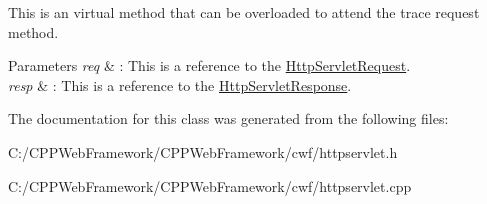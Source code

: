 This is an virtual method that can be overloaded to attend the trace request method. 


\begin{DoxyParams}{Parameters}
{\em req} & \+: This is a reference to the \mbox{\hyperlink{class_http_servlet_request}{Http\+Servlet\+Request}}. \\
\hline
{\em resp} & \+: This is a reference to the \mbox{\hyperlink{class_http_servlet_response}{Http\+Servlet\+Response}}. \\
\hline
\end{DoxyParams}


The documentation for this class was generated from the following files\+:\begin{DoxyCompactItemize}
\item 
C\+:/\+C\+P\+P\+Web\+Framework/\+C\+P\+P\+Web\+Framework/cwf/httpservlet.\+h\item 
C\+:/\+C\+P\+P\+Web\+Framework/\+C\+P\+P\+Web\+Framework/cwf/httpservlet.\+cpp\end{DoxyCompactItemize}
